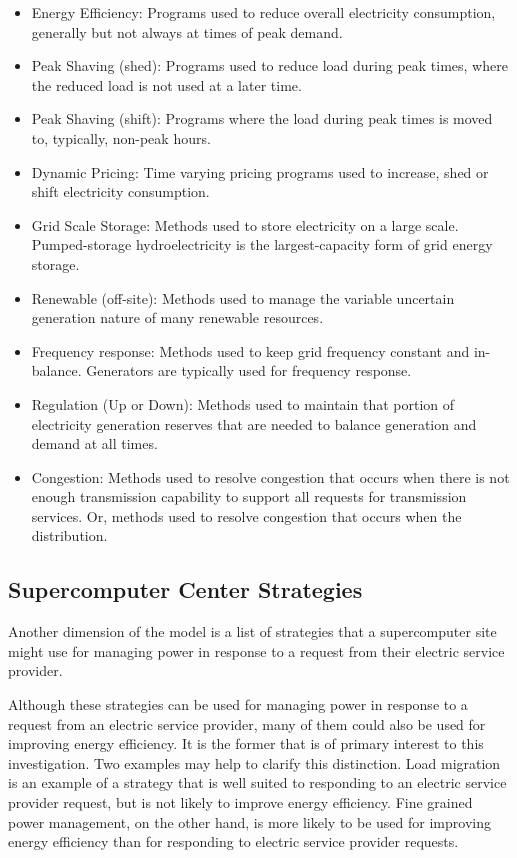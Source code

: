 \documentclass{llncs}
\begin{document}
\begin{itemize}
\item Energy Efficiency: Programs used to reduce overall electricity consumption, generally but not always at times of
 peak demand.
\item Peak Shaving (shed): Programs used to reduce load during peak times, where the reduced load is not used at a 
later time.
\item Peak Shaving (shift): Programs where the load during peak times is moved to, typically, non-peak hours.
\item Dynamic Pricing: Time varying pricing programs used to increase, shed or shift electricity consumption.
\item Grid Scale Storage: Methods used to store electricity on a large scale. Pumped-storage hydroelectricity 
is the largest-capacity form of grid energy storage.
\item Renewable (off-site): Methods used to manage the variable uncertain generation nature of many renewable resources.
\item Frequency response: Methods used to keep grid frequency constant and in-balance. Generators are typically used for frequency response.
\item Regulation (Up or Down): Methods used to maintain that portion of electricity generation reserves 
that are needed to balance generation and demand at all times.
\item Congestion: Methods used to resolve congestion that occurs when there is not enough transmission capability to 
support all requests for transmission services. Or, methods used to resolve congestion that occurs when the distribution.
\end{itemize}

\subsection{Supercomputer Center Strategies}

Another dimension of the model is a list of strategies that a supercomputer
site might use for managing power in response to a request from their
electric service provider.

Although these strategies can be used for managing power in response to a
request from an electric service provider, many of them could also be used
for improving energy efficiency. It is the former that is of primary
interest to this investigation. Two examples may help to clarify this
distinction. Load migration is an example of a strategy that is well suited
to responding to an electric service provider request, but is not likely to
improve energy efficiency. Fine grained power management, on the other hand,
is more likely to be used for improving energy efficiency than for
responding to electric service provider requests.
\end{document}

